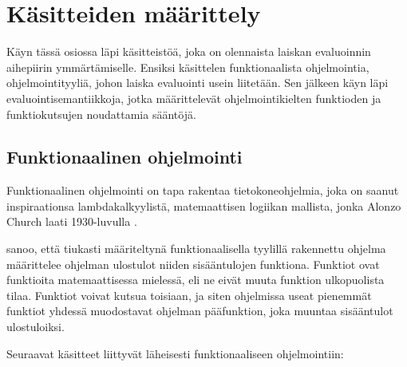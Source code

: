 \section{Käsitteiden määrittely}\label{kasitteisto}

Käyn tässä osiossa läpi käsitteistöä, joka on olennaista laiskan evaluoinnin aihepiirin ymmärtämiselle. Ensiksi käsittelen funktionaalista ohjelmointia, ohjelmointityyliä, johon laiska evaluointi usein liitetään. Sen jälkeen käyn läpi evaluointisemantiikkoja, jotka määrittelevät ohjelmointikielten funktioden ja funktiokutsujen noudattamia sääntöjä.

\subsection{Funktionaalinen ohjelmointi}
Funktionaalinen ohjelmointi on tapa rakentaa tietokoneohjelmia, joka on saanut inspiraationsa lambdakalkyylistä, matemaattisen logiikan mallista, jonka Alonzo Church laati 1930-luvulla \citep{church1932set}.

\citet{scott2009programming} sanoo, että tiukasti määriteltynä funktionaalisella tyylillä rakennettu ohjelma määrittelee ohjelman ulostulot niiden sisääntulojen funktiona. Funktiot ovat funktioita matemaattisessa mielessä, eli ne eivät muuta funktion ulkopuolista tilaa. Funktiot voivat kutsua toisiaan, ja siten ohjelmissa useat pienemmät funktiot yhdessä muodostavat ohjelman pääfunktion, joka muuntaa sisääntulot ulostuloiksi.

Seuraavat käsitteet liittyvät läheisesti funktionaaliseen ohjelmointiin:

